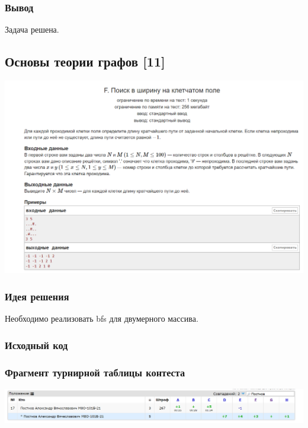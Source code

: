 \subsubsection*{Вывод}
Задача решена.

\vspace{20pt}

\pagebreak

\subsection*{Основы теории графов [11]}
\begin{center}
\includegraphics[width=\textwidth]{statements/13.png}
\end{center}
\subsubsection*{Идея решения}
Необходимо реализовать bfs для двумерного массива.
\subsubsection*{Исходный код}


\subsubsection*{Фрагмент турнирной таблицы контеста}
\begin{center}
\includegraphics[width=\textwidth]{standings/13.png}\newline\noindent
\end{center}

